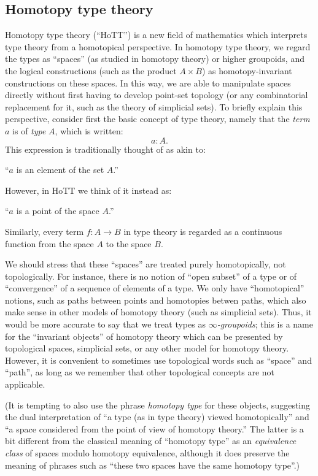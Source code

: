 \subsection*{Homotopy type theory}

Homotopy type theory (``HoTT'') is a new field of mathematics which interprets type theory from a homotopical perspective.
In homotopy type theory, we regard the types as ``spaces'' (as studied in homotopy theory) or higher groupoids, and the logical constructions (such as the product $A\times B$) as homotopy-invariant constructions on these spaces.
In this way, we are able to manipulate spaces directly without first having to develop point-set topology (or any combinatorial replacement for it, such as the theory of simplicial sets).
To briefly explain this perspective, consider first the basic concept of type theory, namely that
the \emph{term} $a$ is of \emph{type} $A$, which is written:
\[ a:A. \]
This expression is traditionally thought of as akin to:
\begin{center}
``$a$ is an element of the set $A$.''
\end{center}
However, in HoTT we think of it instead as:
\begin{center}
``$a$ is a point of the space $A$.''
\end{center}
Similarly, every term $f : A\to B$ in type theory is regarded as a continuous function from the space $A$ to the space $B$.

We should stress that these ``spaces'' are treated purely homotopically, not topologically.
For instance, there is no notion of ``open subset'' of a type or of ``convergence'' of a sequence of elements of a type.
We only have ``homotopical'' notions, such as paths between points and homotopies betwen paths, which also make sense in other models of homotopy theory (such as simplicial sets).
Thus, it would be more accurate to say that we treat types as \emph{$\infty$-groupoids}; this is a name for the ``invariant objects'' of homotopy theory which can be presented by topological spaces, simplicial sets, or any other model for homotopy theory.
However, it is convenient to sometimes use topological words such as ``space'' and ``path'', as long as we remember that other topological concepts are not applicable.

(It is tempting to also use the phrase \emph{homotopy type} for these objects, suggesting the dual interpretation of ``a type (as in type theory) viewed homotopically'' and ``a space considered from the point of view of homotopy theory.''
The latter is a bit different from the classical meaning of ``homotopy type'' as an \emph{equivalence class} of spaces modulo homotopy equivalence, although it does preserve the meaning of phrases such as ``these two spaces have the same homotopy type''.)

